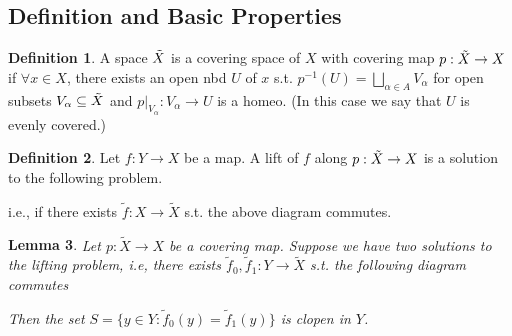 \documentclass{article}
\theoremstyle{definition}
\newtheorem{defn}{Definition}[section]
\theoremstyle{remark}
\theoremstyle{plain}
\newtheorem{lem}[defn]{Lemma}
\begin{document}
\subsection{Definition and Basic Properties}
\begin{defn}
    A space $\Tilde{X}$ is a covering space of $X$ with covering map $p:\Tilde{X}\to X$ if $\forall x\in X$, there exists an open nbd $U$ of $x$ s.t. $p^{-1}(U)=\bigsqcup_{\alpha\in A} V_\alpha$ for open subsets $V_\alpha\subseteq \Tilde{X}$ and $p|_{V_\alpha}:V_\alpha\to U$ is a homeo. (In this case we say that $U$ is evenly covered.)
\end{defn}
\begin{defn}
    Let $f:Y\to X$ be a map. A lift of $f$ along $p:\Tilde{X}\to X$ is a solution to the following problem.
    \begin{center}
    \end{center}
    i.e., if there exists $\tilde f:X\to \tilde X$ s.t. the above diagram commutes.
\end{defn}
\begin{lem}
    Let $p:\tilde X\to X$ be a covering map. Suppose we have two solutions to the lifting problem, i.e, there exists $\tilde f_0,\tilde f_1:Y\to\tilde X$ s.t. the following diagram commutes
    \begin{center}
    \end{center}
    Then the set $S=\{y\in Y:\tilde f_0(y)=\tilde f_1(y)\}$ is clopen in $Y$.
\end{lem}
\end{document}
